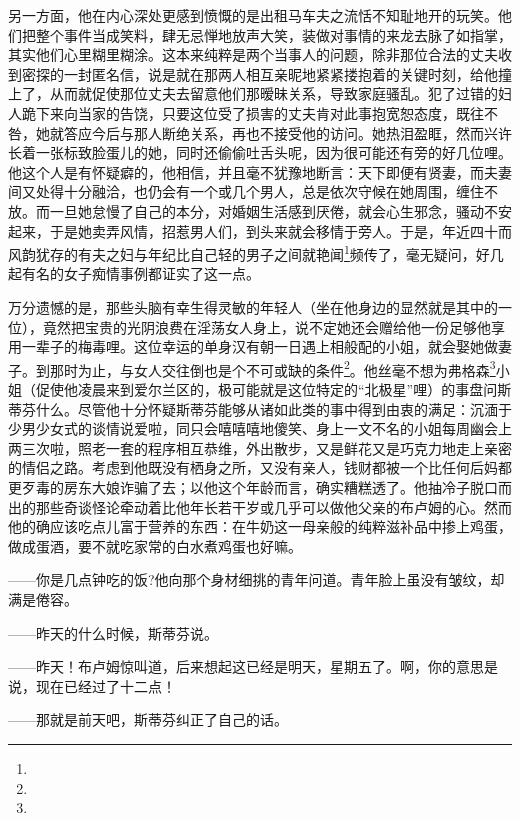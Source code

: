 \par 另一方面，他在内心深处更感到愤慨的是出租马车夫之流恬不知耻地开的玩笑。他们把整个事件当成笑料，肆无忌惮地放声大笑，装做对事情的来龙去脉了如指掌，其实他们心里糊里糊涂。这本来纯粹是两个当事人的问题，除非那位合法的丈夫收到密探的一封匿名信，说是就在那两人相互亲昵地紧紧搂抱着的关键时刻，给他撞上了，从而就促使那位丈夫去留意他们那暧昧关系，导致家庭骚乱。犯了过错的妇人跪下来向当家的告饶，只要这位受了损害的丈夫肯对此事抱宽恕态度，既往不咎，她就答应今后与那人断绝关系，再也不接受他的访问。她热泪盈眶，然而兴许长着一张标致脸蛋儿的她，同时还偷偷吐舌头呢，因为很可能还有旁的好几位哩。他这个人是有怀疑癖的，他相信，并且毫不犹豫地断言：天下即便有贤妻，而夫妻间又处得十分融洽，也仍会有一个或几个男人，总是依次守候在她周围，缠住不放。而一旦她怠慢了自己的本分，对婚姻生活感到厌倦，就会心生邪念，骚动不安起来，于是她卖弄风情，招惹男人们，到头来就会移情于旁人。于是，年近四十而风韵犹存的有夫之妇与年纪比自己轻的男子之间就艳闻\footnote{}频传了，毫无疑问，好几起有名的女子痴情事例都证实了这一点。
\par 万分遗憾的是，那些头脑有幸生得灵敏的年轻人（坐在他身边的显然就是其中的一位），竟然把宝贵的光阴浪费在淫荡女人身上，说不定她还会赠给他一份足够他享用一辈子的梅毒哩。这位幸运的单身汉有朝一日遇上相般配的小姐，就会娶她做妻子。到那时为止，与女人交往倒也是个不可或缺的条件\footnote{}。他丝毫不想为弗格森\footnote{}小姐（促使他凌晨来到爱尔兰区的，极可能就是这位特定的“北极星”哩）的事盘问斯蒂芬什么。尽管他十分怀疑斯蒂芬能够从诸如此类的事中得到由衷的满足：沉湎于少男少女式的谈情说爱啦，同只会嘻嘻嘻地傻笑、身上一文不名的小姐每周幽会上两三次啦，照老一套的程序相互恭维，外出散步，又是鲜花又是巧克力地走上亲密的情侣之路。考虑到他既没有栖身之所，又没有亲人，钱财都被一个比任何后妈都更歹毒的房东大娘诈骗了去；以他这个年龄而言，确实糟糕透了。他抽冷子脱口而出的那些奇谈怪论牵动着比他年长若干岁或几乎可以做他父亲的布卢姆的心。然而他的确应该吃点儿富于营养的东西：在牛奶这一母亲般的纯粹滋补品中掺上鸡蛋，做成蛋酒，要不就吃家常的白水煮鸡蛋也好嘛。
\par ——你是几点钟吃的饭?他向那个身材细挑的青年问道。青年脸上虽没有皱纹，却满是倦容。
\par ——昨天的什么时候，斯蒂芬说。
\par ——昨天！布卢姆惊叫道，后来想起这已经是明天，星期五了。啊，你的意思是说，现在已经过了十二点！
\par ——那就是前天吧，斯蒂芬纠正了自己的话。
